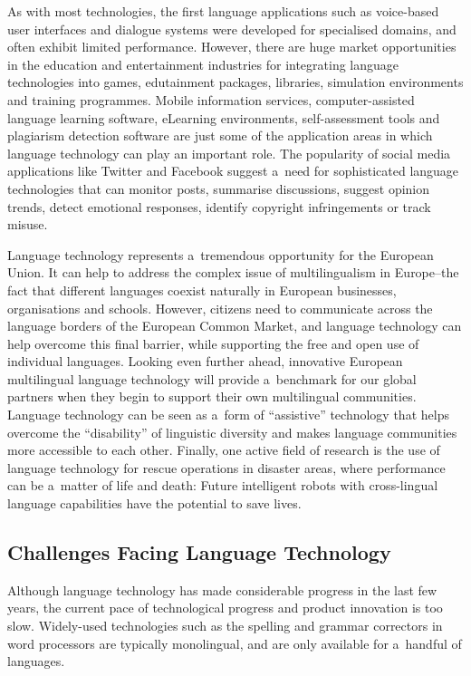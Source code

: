 \begin{multicols}{2}
As with most technologies, the first language applications such as
voice-based user interfaces and dialogue systems were developed for
specialised domains, and often exhibit limited performance. However,
there are huge market opportunities in the education and entertainment
industries for integrating language technologies into games,
edutainment packages, libraries, simulation environments and training
programmes. Mobile information services, computer-assisted language
learning software, eLearning environments, self-assessment tools and
plagiarism detection software are just some of the application areas
in which language technology can play an important role. The
popularity of social media applications like Twitter and Facebook
suggest a~need for sophisticated language technologies that can
monitor posts, summarise discussions, suggest opinion trends, detect
emotional responses, identify copyright infringements or track misuse. 


Language technology represents a~tremendous opportunity for the
European Union. It can help to address the complex issue of
multilingualism in Europe--the fact that different languages coexist
naturally in European businesses, organisations and schools. However,
citizens need to communicate across the language borders of the
European Common Market, and language technology can help overcome this
final barrier, while supporting the free and open use of individual
languages. Looking even further ahead, innovative European
multilingual language technology will provide a~benchmark for our
global partners when they begin to support their own multilingual
communities. Language technology can be seen as a~form of
“assistive” technology that helps overcome the “disability” of
linguistic diversity and makes language communities more accessible to
each other. Finally, one active field of research is the use of
language technology for rescue operations in disaster areas, where
performance can be a~matter of life and death: Future intelligent
robots with cross-lingual language capabilities have the potential to
save lives. 

\subsection{Challenges Facing Language Technology} 

Although language technology has made considerable progress in the
last few years, the current pace of technological progress and product
innovation is too slow. Widely-used technologies such as the spelling
and grammar correctors in word processors are typically monolingual,
and are only available for a~handful of languages. 


\end{multicols}
